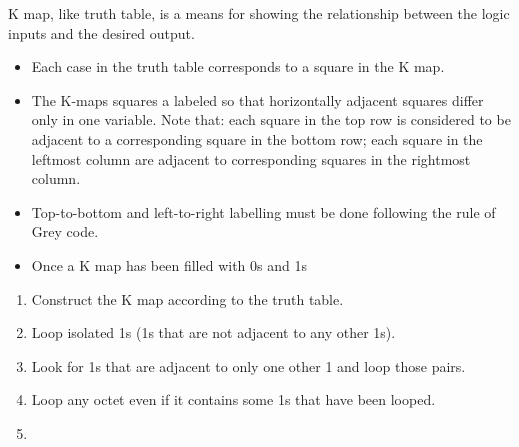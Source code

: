         \par K map, like truth table, is a means for showing the relationship between
        the logic inputs and the desired output.
        \begin{itemize}
            \item Each case in the truth table corresponds to a square in the K map.
            \item The K-maps squares a labeled so that horizontally adjacent squares differ
                only in one variable. Note that: each square in the top row is considered to be
                adjacent to a corresponding square in the bottom row; each square in the leftmost
                column are adjacent to corresponding squares in the rightmost column.
            \item Top-to-bottom and left-to-right labelling must be done following the rule of Grey
                code.
            \item Once a K map has been filled with 0s and 1s
        \end{itemize}
        \begin{enumerate}
            \item Construct the K map according to the truth table.
            \item Loop isolated 1s (1s that are not adjacent to any other 1s).
            \item Look for 1s that are adjacent to only one other 1 and loop
            those pairs.
            \item Loop any octet even if it contains some 1s that have been looped.
            \item 
        \end{enumerate}
